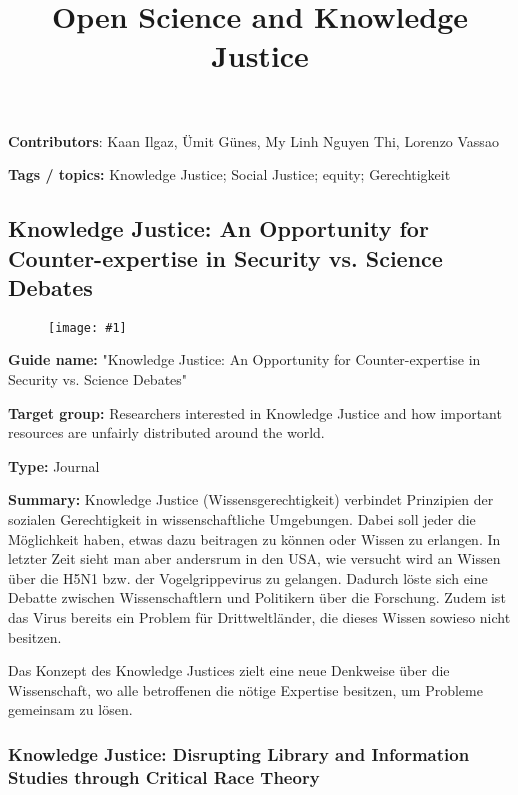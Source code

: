 \documentclass{article}
\newlength{\imgwidth}
\newcommand\scaledgraphics[2]{%
                
\settowidth{\imgwidth}{\texttt{[image: \#1]}}%
                
\setlength{\imgwidth}{\minof{\imgwidth}{#2\textwidth}}%
                
\texttt{[image: \#1]}%
                
}
\begin{document}
\title{Open Science and Knowledge Justice}

\maketitle


\textbf{Contributors}: Kaan Ilgaz, Ümit Günes, My Linh Nguyen Thi, Lorenzo Vassao


\textbf{Tags / topics:} Knowledge Justice; Social Justice; equity; Gerechtigkeit


\subsection{Knowledge Justice: An Opportunity for Counter-expertise in Security vs. Science Debates}\label{H870315}


\begin{figure}
\scaledgraphics{086e7cc2-fafd-4cc2-8c8f-018ac3a9884d.png}{1}
\label{F24704971}
\end{figure}





\textbf{Guide name:} "Knowledge Justice: An Opportunity for Counter-expertise in Security vs. Science Debates" \autocite{r_egert_knowledge_2017}


\textbf{Target group: }Researchers interested in Knowledge Justice and how important resources are unfairly distributed around the world.


\textbf{Type:} Journal


\textbf{Summary: }Knowledge Justice (Wissensgerechtigkeit) verbindet Prinzipien der sozialen Gerechtigkeit in wissenschaftliche Umgebungen. Dabei soll jeder die Möglichkeit haben, etwas dazu beitragen zu können oder Wissen zu erlangen. In letzter Zeit sieht man aber andersrum in den USA, wie versucht wird an Wissen über die H5N1 bzw. der Vogelgrippevirus zu gelangen. Dadurch löste sich eine Debatte zwischen Wissenschaftlern und Politikern über die Forschung. Zudem ist das Virus bereits ein Problem für Drittweltländer, die dieses Wissen sowieso nicht besitzen.


Das Konzept des Knowledge Justices zielt eine neue Denkweise über die Wissenschaft, wo alle betroffenen die nötige Expertise besitzen, um Probleme gemeinsam zu lösen.


\subsubsection{Knowledge Justice: Disrupting Library and Information Studies through Critical Race Theory}\label{H8244312}
\end{document}
